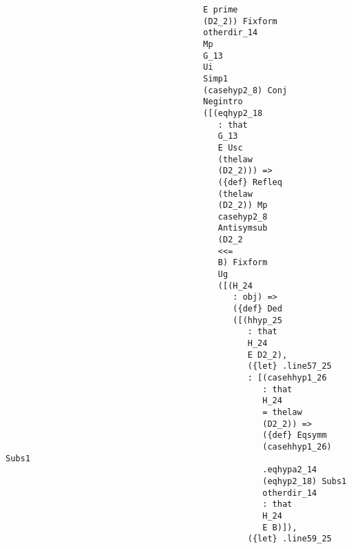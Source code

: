 \documentclass[12pt]{article}
\begin{document}
\begin{verbatim}
                                        E prime 
                                        (D2_2)) Fixform 
                                        otherdir_14 
                                        Mp 
                                        G_13 
                                        Ui 
                                        Simp1 
                                        (casehyp2_8) Conj 
                                        Negintro 
                                        ([(eqhyp2_18 
                                           : that 
                                           G_13 
                                           E Usc 
                                           (thelaw 
                                           (D2_2))) => 
                                           ({def} Refleq 
                                           (thelaw 
                                           (D2_2)) Mp 
                                           casehyp2_8 
                                           Antisymsub 
                                           (D2_2 
                                           <<= 
                                           B) Fixform 
                                           Ug 
                                           ([(H_24 
                                              : obj) => 
                                              ({def} Ded 
                                              ([(hhyp_25 
                                                 : that 
                                                 H_24 
                                                 E D2_2), 
                                                 ({let} .line57_25 
                                                 : [(casehhyp1_26 
                                                    : that 
                                                    H_24 
                                                    = thelaw 
                                                    (D2_2)) => 
                                                    ({def} Eqsymm 
                                                    (casehhyp1_26) Subs1 
                                                    .eqhypa2_14 
                                                    (eqhyp2_18) Subs1 
                                                    otherdir_14 
                                                    : that 
                                                    H_24 
                                                    E B)]), 
                                                 ({let} .line59_25 

\end{verbatim}
\end{document}
